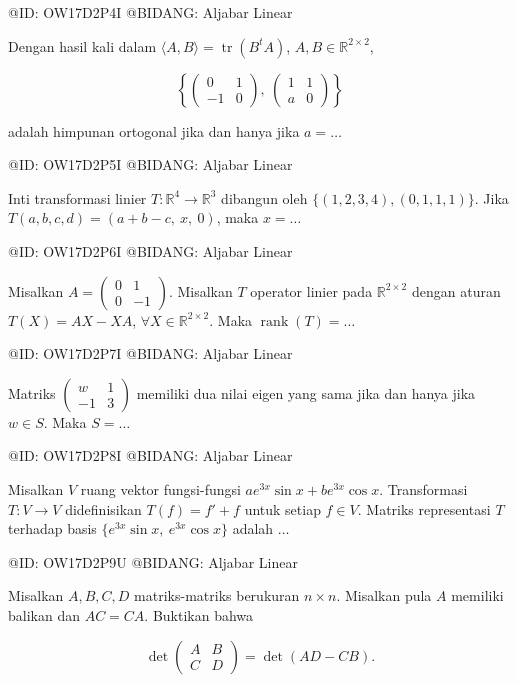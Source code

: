 @ID: OW17D2P4I
@BIDANG: Aljabar Linear

Dengan hasil kali dalam $\langle A,B\rangle=\operatorname{tr}(B^tA)$, $A,B\in\mathbb R^{2\times 2}$,

$$
\left\{\begin{pmatrix}0 & 1\\ -1 & 0\end{pmatrix},\ \begin{pmatrix}1 & 1\\ a & 0\end{pmatrix}\right\}
$$

adalah himpunan ortogonal jika dan hanya jika $a=\ldots$

@ID: OW17D2P5I
@BIDANG: Aljabar Linear

Inti transformasi linier $T:\mathbb R^4\to\mathbb R^3$ dibangun oleh $\{(1,2,3,4),(0,1,1,1)\}$. Jika $T(a,b,c,d)=(a+b-c,\ x,\ 0)$, maka $x=\ldots$

@ID: OW17D2P6I
@BIDANG: Aljabar Linear

Misalkan $A=\begin{pmatrix}0 & 1\\ 0 & -1\end{pmatrix}$. Misalkan $T$ operator linier pada $\mathbb R^{2\times 2}$ dengan aturan $T(X)=AX-XA$, $\forall X\in\mathbb R^{2\times 2}$. Maka $\operatorname{rank}(T)=\ldots$

@ID: OW17D2P7I
@BIDANG: Aljabar Linear

Matriks $\begin{pmatrix}w & 1\\ -1 & 3\end{pmatrix}$ memiliki dua nilai eigen yang sama jika dan hanya jika $w\in S$. Maka $S=\ldots$

@ID: OW17D2P8I
@BIDANG: Aljabar Linear

Misalkan $V$ ruang vektor fungsi-fungsi $ae^{3x}\sin x+be^{3x}\cos x$. Transformasi $T:V\to V$ didefinisikan $T(f)=f'+f$ untuk setiap $f\in V$. Matriks representasi $T$ terhadap basis $\{e^{3x}\sin x,\ e^{3x}\cos x\}$ adalah $\ldots$

@ID: OW17D2P9U
@BIDANG: Aljabar Linear

Misalkan $A,B,C,D$ matriks-matriks berukuran $n\times n$. Misalkan pula $A$ memiliki balikan dan $AC=CA$. Buktikan bahwa

$$
\det\begin{pmatrix}A & B\\ C & D\end{pmatrix}=\det(AD-CB).
$$


